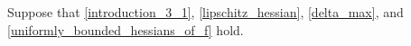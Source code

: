 Suppose that \cref{introduction_3_1}, \cref{lipschitz_hessian}, \cref{delta_max}, and \cref{uniformly_bounded_hessians_of_f} hold.
